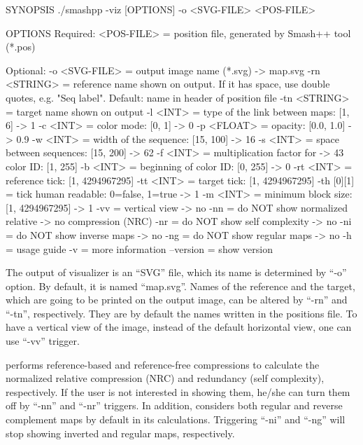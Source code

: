 \begin{code}[style=bash]
SYNOPSIS
  ./smashpp -viz [OPTIONS]  -o <SVG-FILE>  <POS-FILE>

OPTIONS
  Required:
  <POS-FILE>         = position file, generated by
                       Smash++ tool (*.pos)

  Optional:
  -o  <SVG-FILE>     = output image name (*.svg)             -> map.svg
  -rn <STRING>       = reference name shown on output. If it
                       has space, use double quotes, e.g.
                       "Seq label". Default: name in header
                       of position file
  -tn <STRING>       = target name shown on output
  -l  <INT>          = type of the link between maps: [1, 6] -> 1
  -c  <INT>          = color mode: [0, 1]                    -> 0
  -p  <FLOAT>        = opacity: [0.0, 1.0]                   -> 0.9
  -w  <INT>          = width of the sequence: [15, 100]      -> 16
  -s  <INT>          = space between sequences: [15, 200]    -> 62
  -f  <INT>          = multiplication factor for             -> 43
                       color ID: [1, 255]
  -b  <INT>          = beginning of color ID: [0, 255]       -> 0
  -rt <INT>          = reference tick: [1, 4294967295]
  -tt <INT>          = target tick: [1, 4294967295]
  -th [0][1]         = tick human readable: 0=false, 1=true  -> 1
  -m  <INT>          = minimum block size: [1, 4294967295]   -> 1
  -vv                = vertical view                         -> no
  -nn                = do NOT show normalized relative       -> no
                       compression (NRC)
  -nr                = do NOT show self complexity           -> no
  -ni                = do NOT show inverse maps              -> no
  -ng                = do NOT show regular maps              -> no
  -h                 = usage guide
  -v                 = more information
  --version          = show version
\end{code}

The output of \smashpp visualizer is an ``SVG'' file, which its name is determined by ``-o'' option. By default, it is named ``map.svg''. Names of the reference and the target, which are going to be printed on the output image, can be altered by ``-rn'' and ``-tn'', respectively. They are by default the names written in the positions file. To have a vertical view of the image, instead of the default horizontal view, one can use ``-vv'' trigger.

\smashpp performs reference-based and reference-free compressions to calculate the normalized relative compression (NRC) and redundancy (self complexity), respectively. If the user is not interested in showing them, he/she can turn them off by ``-nn'' and ``-nr'' triggers. In addition, \smashpp considers both regular and reverse complement maps by default in its calculations. Triggering ``-ni'' and ``-ng'' will stop showing inverted and regular maps, respectively.

